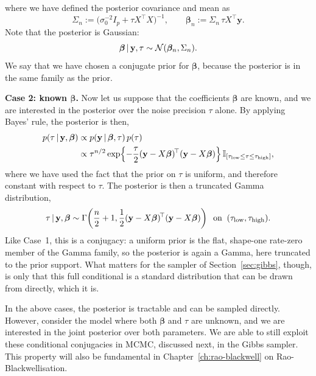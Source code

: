 %
where we have defined the posterior covariance and mean as
%
\begin{equation}
  \Sigma_n := \big(\sigma_0^{-2} I_p + \tau X^{\!\top}X\big)^{-1},
  \qquad
  \bm{\beta}_n := \Sigma_n\,\tau X^{\!\top}\mathbf{y}.
  \label{eq:lr-defs}
\end{equation}
%
Note that the posterior is Gaussian:
%
\begin{equation}
  \bm{\beta} \,|\, \mathbf{y}, \tau \sim \mathcal{N}(\bm{\beta}_n, \Sigma_n).
  \label{eq:lr-conditional}
\end{equation}
%
We say that we have chosen a conjugate prior for $\bm{\beta}$, because
the posterior is in the same family as the prior.


\textbf{Case 2: known $\bm{\beta}$.} Now let us suppose that the
coefficients $\bm{\beta}$ are known, and we are interested in the
posterior over the noise precision $\tau$ alone. By applying Bayes'
rule, the posterior is then,
%
\begin{align}
  p(\tau \,|\, \mathbf{y}, \bm{\beta})
  &\propto p(\mathbf{y} \,|\, \bm{\beta}, \tau)\,p(\tau) \notag\\
  &\propto \tau^{n/2} \exp\!\left \{-\frac{\tau}{2}
    (\mathbf{y} - X\bm{\beta})^{\!\top}(\mathbf{y} - X\bm{\beta})\right \}
    \mathbb{I}_{[\tau_{\text{low}} \le \tau \le \tau_{\text{high}}]},
\end{align}
%
where we have used the fact that the prior on $\tau$ is uniform, and
therefore constant with respect to $\tau$. The posterior is then a
truncated Gamma distribution,
%
\begin{equation}
  \tau \,|\, \mathbf{y}, \bm{\beta} \sim
  \Gamma\!\left(\frac{n}{2} + 1,
  \frac{1}{2}(\mathbf{y} - X\bm{\beta})^{\!\top}(\mathbf{y} - X\bm{\beta})
  \right) 
  \;\;\text{on}\;\; (\tau_{\text{low}}, \tau_{\text{high}}).
  \label{eq:lr-tau-posterior}
\end{equation}
%
Like Case~1, this is a conjugacy: a uniform prior is the flat,
shape-one rate-zero member of the Gamma family, so the posterior is
again a Gamma, here truncated to the prior support. What matters for the
sampler of Section~\ref{sec:gibbs}, though, is only that this full
conditional is a standard distribution that can be drawn from directly,
which it is.

In the above cases, the posterior is tractable and can be sampled
directly. However, consider the model where both $\bm{\beta}$ and
$\tau$ are unknown, and we are interested in the joint posterior over
both parameters. We are able to still exploit these conditional
conjugacies in MCMC, discussed next, in the Gibbs sampler. This
property will also be fundamental in Chapter~\ref{ch:rao-blackwell} on
Rao-Blackwellisation.


